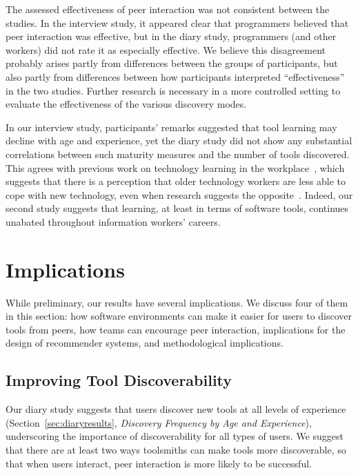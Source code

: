 \documentclass[smallextended]{svjour3}
\newcommand\discovery{peer interaction\xspace}
\begin{document}
The assessed effectiveness of \discovery was not consistent between the studies.
In the interview study, it appeared clear that programmers believed that
\discovery was effective, but in the diary study, 
programmers (and other workers) did not rate it as especially effective. 
We believe this disagreement probably arises partly from differences
between the groups of participants, but also partly from differences between
how participants interpreted ``effectiveness'' in the two studies.
Further research is necessary in a more controlled setting to evaluate
the effectiveness of the various discovery modes.

In our interview study, participants' remarks suggested that tool learning may decline with
age and experience, yet the diary study did not show any substantial 
correlations between such maturity measures and the number of tools discovered.
This agrees with previous work on technology learning in the workplace~\citep{brooke},
which suggests that there is a perception that older technology workers
are less able to cope with new technology, even when research suggests
the opposite~\citep{morrison}.
Indeed, our second study suggests that learning, at least in terms of software tools,
continues unabated throughout information workers' careers.

\section{Implications}\label{sec:discussion}

\noindent
While preliminary, our results have several implications.
We discuss four of them in this section: how software
environments can make it easier for users to discover tools from peers,
how teams can encourage \discovery,
implications for the design of recommender systems,
and methodological implications.

\subsection{Improving Tool Discoverability}\label{sec:discoverability}

\noindent
Our diary study suggests that users discover new tools 
at all levels of experience (Section~\ref{sec:diaryresults}, \textit{Discovery Frequency by Age and Experience}), 
underscoring the importance of discoverability for all types of users.
We suggest that there are at least two ways toolsmiths can make
tools more discoverable, so that when users interact, \discovery is 
more likely to be successful.
\end{document}

